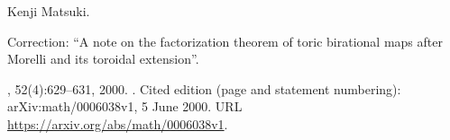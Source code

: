 Kenji Matsuki.

\newblock Correction: ``A note on the factorization theorem of toric
  birational maps after {Morelli} and its toroidal extension''.

, 52(4):629--631, 2000.
\newblock {}.
\newblock Cited edition (page and statement numbering): arXiv:math/0006038v1, 5 June 2000.
\newblock URL \url{https://arxiv.org/abs/math/0006038v1}.


